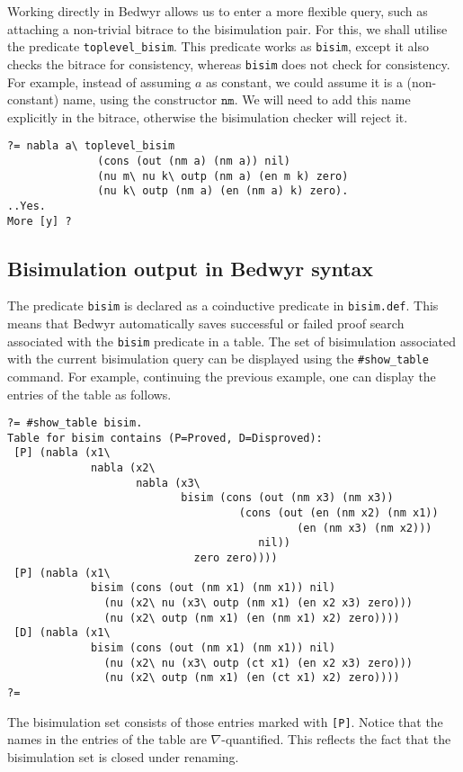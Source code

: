 \documentclass{article}
\newcommand\obj[1]{\texttt{#1}}
\begin{document}
Working directly in Bedwyr allows us to enter a more flexible query, 
such as attaching a non-trivial bitrace to the bisimulation pair. 
For this, we shall utilise the predicate \obj{toplevel\_bisim}. This predicate
works as \obj{bisim}, except it also checks the bitrace for consistency, whereas
\obj{bisim} does not check for consistency. 
For example, instead of assuming $a$ as constant, we could assume it is
a (non-constant) name, using the constructor $\obj{nm}.$ We will need to add this
name explicitly in the bitrace, otherwise the bisimulation checker will reject it. 
\begin{verbatim}
?= nabla a\ toplevel_bisim 
              (cons (out (nm a) (nm a)) nil)  
              (nu m\ nu k\ outp (nm a) (en m k) zero) 
              (nu k\ outp (nm a) (en (nm a) k) zero).
..Yes.
More [y] ?
\end{verbatim}

\subsection{Bisimulation output in Bedwyr syntax}

The predicate \obj{bisim} is declared as a coinductive predicate in \obj{bisim.def}.
This means that Bedwyr automatically saves successful or failed proof search
associated with the \obj{bisim} predicate in a table. The set of bisimulation
associated with the current bisimulation query can be displayed using the
\obj{\#show\_table} command. For example, continuing the previous example,
one can display the entries of the table as follows. 

\begin{verbatim}
?= #show_table bisim.
Table for bisim contains (P=Proved, D=Disproved):
 [P] (nabla (x1\
             nabla (x2\
                    nabla (x3\
                           bisim (cons (out (nm x3) (nm x3))
                                    (cons (out (en (nm x2) (nm x1))
                                             (en (nm x3) (nm x2)))
                                       nil))
                             zero zero))))
 [P] (nabla (x1\
             bisim (cons (out (nm x1) (nm x1)) nil)
               (nu (x2\ nu (x3\ outp (nm x1) (en x2 x3) zero)))
               (nu (x2\ outp (nm x1) (en (nm x1) x2) zero))))
 [D] (nabla (x1\
             bisim (cons (out (nm x1) (nm x1)) nil)
               (nu (x2\ nu (x3\ outp (ct x1) (en x2 x3) zero)))
               (nu (x2\ outp (nm x1) (en (ct x1) x2) zero))))
?= 
\end{verbatim}
The bisimulation set consists of those entries marked with \obj{[P]}.
Notice that the names in the entries of the table are $\nabla$-quantified.
This reflects the fact that the bisimulation set is closed under
renaming. 
\end{document}
